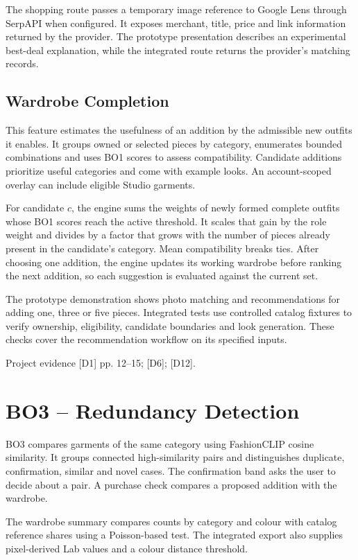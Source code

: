\documentclass[11pt,a4paper]{article}
\newcommand{\src}[1]{\par{\footnotesize\textcolor{muted}{Project evidence #1.}}\par}
\begin{document}
The shopping route passes a temporary image reference to Google Lens through SerpAPI when configured. It exposes merchant, title, price and link information returned by the provider. The prototype presentation describes an experimental best-deal explanation, while the integrated route returns the provider's matching records.

\subsection*{Wardrobe Completion}
This feature estimates the usefulness of an addition by the admissible new outfits it enables. It groups owned or selected pieces by category, enumerates bounded combinations and uses BO1 scores to assess compatibility. Candidate additions prioritize useful categories and come with example looks. An account-scoped overlay can include eligible Studio garments.

For candidate \(c\), the engine sums the weights of newly formed complete outfits whose BO1 scores reach the active threshold. It scales that gain by the role weight and divides by a factor that grows with the number of pieces already present in the candidate's category. Mean compatibility breaks ties. After choosing one addition, the engine updates its working wardrobe before ranking the next addition, so each suggestion is evaluated against the current set.

The prototype demonstration shows photo matching and recommendations for adding one, three or five pieces. Integrated tests use controlled catalog fixtures to verify ownership, eligibility, candidate boundaries and look generation. These checks cover the recommendation workflow on its specified inputs.
\src{[D1] pp. 12--15; [D6]; [D12]}

\clearpage
\section{BO3 -- Redundancy Detection}
BO3 compares garments of the same category using FashionCLIP cosine similarity. It groups connected high-similarity pairs and distinguishes duplicate, confirmation, similar and novel cases. The confirmation band asks the user to decide about a pair. A purchase check compares a proposed addition with the wardrobe.

The wardrobe summary compares counts by category and colour with catalog reference shares using a Poisson-based test. The integrated export also supplies pixel-derived Lab values and a colour distance threshold.
\end{document}
